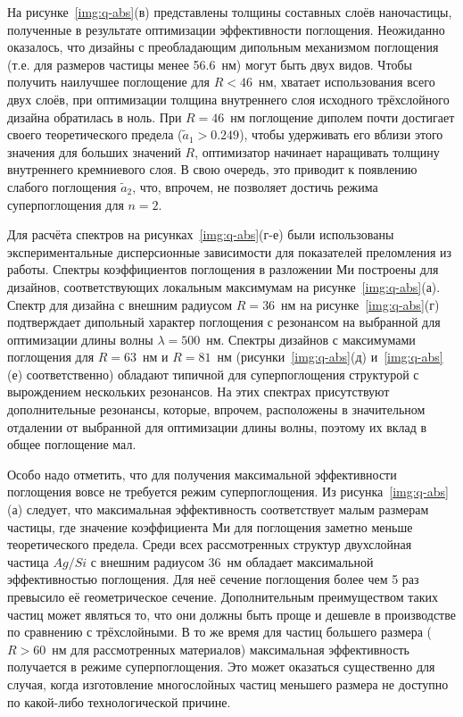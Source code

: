 На рисунке~\ref{img:q-abs}(в) представлены толщины составных слоёв
наночастицы, полученные в результате оптимизации эффективности
поглощения.  Неожиданно оказалось, что дизайны с преобладающим
дипольным механизмом поглощения (т.е. для размеров частицы менее
56.6~нм) могут быть двух видов.  Чтобы получить наилучшее поглощение
для $R<46$~нм, хватает использования всего двух слоёв, при оптимизации
толщина внутреннего слоя исходного трёхслойного дизайна обратилась в
ноль.  При $R=46$~нм поглощение диполем почти достигает своего
теоретического предела ($\tilde{a}_1>0.249$), чтобы удерживать его
вблизи этого значения для больших значений $R$, оптимизатор начинает
наращивать толщину внутреннего кремниевого слоя.  В свою очередь, это
приводит к появлению слабого поглощения  $\tilde{a}_2$,
что, впрочем, не позволяет достичь режима суперпоглощения для $n=2$.

Для расчёта спектров на рисунках~\ref{img:q-abs}(г-е) были
использованы экспериментальные дисперсионные зависимости для
показателей преломления из работы\cite{palik-1997}. Спектры
коэффициентов поглощения в разложении Ми построены для дизайнов,
соответствующих локальным максимумам на
рисунке~\ref{img:q-abs}(а). Спектр для дизайна с внешним радиусом
$R=36$~нм на рисунке~\ref{img:q-abs}(г) подтверждает дипольный
характер поглощения с резонансом на выбранной для оптимизации длины
волны $\lambda=500$~нм.  Спектры дизайнов с максимумами поглощения для
$R=63$~нм и $R=81$~нм (рисунки~\ref{img:q-abs}(д) и~\ref{img:q-abs}(е)
соответственно) обладают типичной для суперпоглощения структурой с
вырождением нескольких резонансов. На этих спектрах присутствуют
дополнительные резонансы, которые, впрочем, расположены в значительном
отдалении от выбранной для оптимизации длины волны, поэтому их вклад в
общее поглощение мал.

Особо надо отметить, что для получения максимальной эффективности
поглощения вовсе не требуется режим суперпоглощения.  Из
рисунка~\ref{img:q-abs}(а) следует, что максимальная эффективность
соответствует малым размерам частицы, где значение коэффициента Ми для
поглощения заметно меньше теоретического предела.  Среди всех
рассмотренных структур двухслойная частица $Ag/Si$ с внешним радиусом
36~нм обладает максимальной эффективностью поглощения.  Для неё
сечение поглощения более чем 5 раз превысило её геометрическое
сечение. Дополнительным преимуществом таких частиц может являться то,
что они должны быть проще и дешевле в производстве по сравнению с
трёхслойными.  В то же время для частиц большего размера ($R>60$~нм
для рассмотренных материалов) максимальная эффективность получается в
режиме суперпоглощения.  Это может оказаться существенно для случая,
когда изготовление многослойных частиц меньшего размера не доступно по
какой-либо технологической причине.

\clearpage